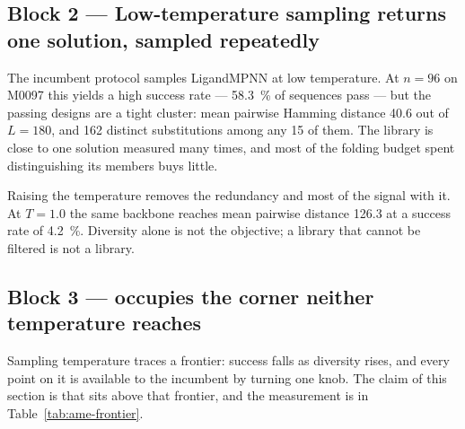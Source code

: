 \subsection*{Block 2 --- Low-temperature sampling returns one solution,
sampled repeatedly}

The incumbent protocol samples LigandMPNN at low temperature. At $n = 96$ on
M0097 this yields a high success rate --- \SI{58.3}{\percent} of sequences pass
--- but the passing designs are a tight cluster: mean pairwise Hamming distance
\num{40.6} out of $L = 180$, and \num{162} distinct substitutions among any 15 of
them. The library is close to one solution measured many times, and most of the
folding budget spent distinguishing its members buys little.

Raising the temperature removes the redundancy and most of the signal with it.
At $T = 1.0$ the same backbone reaches mean pairwise distance \num{126.3} at a
success rate of \SI{4.2}{\percent}. Diversity alone is not the objective; a
library that cannot be filtered is not a library.


\subsection*{Block 3 --- \cleo{} occupies the corner neither temperature reaches}

Sampling temperature traces a frontier: success falls as diversity rises, and
every point on it is available to the incumbent by turning one knob. The claim
of this section is that \cleo{} sits above that frontier, and the measurement is
in Table~\ref{tab:ame-frontier}.

